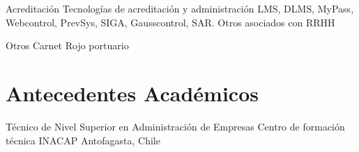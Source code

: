 \documentclass[draft,color,12pt,letterpaper,sans]{moderncv}
\begin{document}
\cventry {}
{Acreditación}
{Tecnologías de acreditación y administración}
{}
{\newline LMS, DLMS, MyPass, Webcontrol, PrevSys, SIGA, Gausscontrol, SAR. \newline Otros asociados con RRHH}
{}

\cventry {}
{Otros}
{}
{}
{\newline Carnet Rojo portuario}
{}

\section{Antecedentes Académicos}
{Técnico de Nivel Superior en Administración de Empresas}
{Centro de formación técnica INACAP}
{Antofagasta, Chile}
{}
{}
\end{document}
